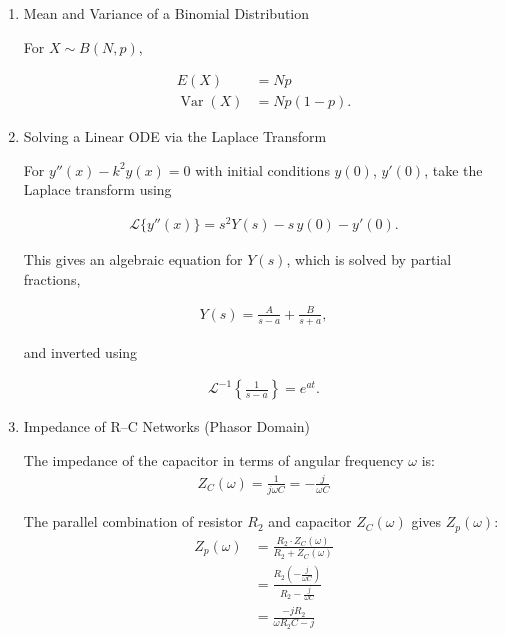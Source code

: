 \begin{enumerate}[label=\thesubsection.\arabic*,ref=\thesubsection.\theenumi]
\item Mean and Variance of a Binomial Distribution

For $X\sim B(N,p)$,

\begin{align}
E(X)&=Np\\
\operatorname{Var}(X)&=Np(1-p). \label{variance}
\end{align}

\item Solving a Linear ODE via the Laplace Transform

For $y''(x)-k^2y(x)=0$ with initial conditions $y(0)$, $y'(0)$, take
the Laplace transform using

\begin{align}
\mathcal{L}\{y''(x)\}=s^{2}Y(s)-s\,y(0)-y'(0). \label{laplace}
\end{align}

This gives an algebraic equation for $Y(s)$, which is solved by
partial fractions,

\begin{align}
Y(s)=\frac{A}{s-a}+\frac{B}{s+a}, \label{partial}
\end{align}

and inverted using

\begin{align}
\mathcal{L}^{-1}\left\{\frac{1}{s-a}\right\}=e^{at}.
\end{align}

\item Impedance of R--C Networks (Phasor Domain) \label{impedence deri}




The impedance of the capacitor in terms of angular frequency $\omega$ is:
\begin{align}
Z_C(\omega) = \frac{1}{j\omega C} = -\frac{j}{\omega C}
\end{align}

The parallel combination of resistor $R_2$ and capacitor $Z_C(\omega)$ gives $Z_p(\omega)$:
\begin{align}
Z_p(\omega) &= \frac{R_2 \cdot Z_C(\omega)}{R_2 + Z_C(\omega)}\\
& = \frac{R_2 \left(-\frac{j}{\omega C}\right)}{R_2 - \frac{j}{\omega C}}\\
& = \frac{-j R_2}{\omega R_2 C - j}
\end{align}


\end{enumerate}
